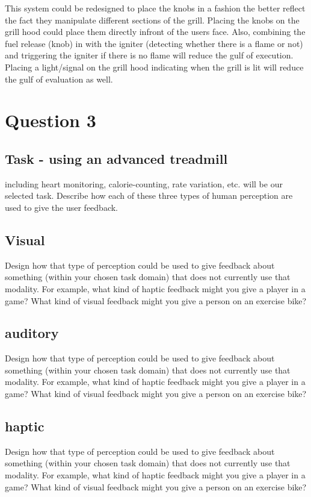 This system could be redesigned to place the knobs in a fashion the better reflect the fact they manipulate different sections of the grill. Placing the knobs on the grill hood could place them directly infront of the users face. Also, combining the fuel release (knob) in with the igniter (detecting whether there is a flame or not) and triggering the igniter if there is no flame will reduce the gulf of execution. Placing a light/signal on the grill hood indicating when the grill is lit will reduce the gulf of evaluation as well.

\section{Question 3}

\subsection{Task - using an advanced treadmill}
including heart monitoring, calorie-counting, rate variation, etc. will be our selected task. Describe how each of these three types of human perception are used to give the user feedback.

\subsection{Visual}
Design how that type of perception could be used to give feedback about something (within your chosen task domain) that does not currently use that modality. For example, what kind of haptic feedback might you give a player in a game? What kind of visual feedback might you give a person on an exercise bike?

\subsection{auditory}
Design how that type of perception could be used to give feedback about something (within your chosen task domain) that does not currently use that modality. For example, what kind of haptic feedback might you give a player in a game? What kind of visual feedback might you give a person on an exercise bike?

\subsection{haptic}
Design how that type of perception could be used to give feedback about something (within your chosen task domain) that does not currently use that modality. For example, what kind of haptic feedback might you give a player in a game? What kind of visual feedback might you give a person on an exercise bike?

